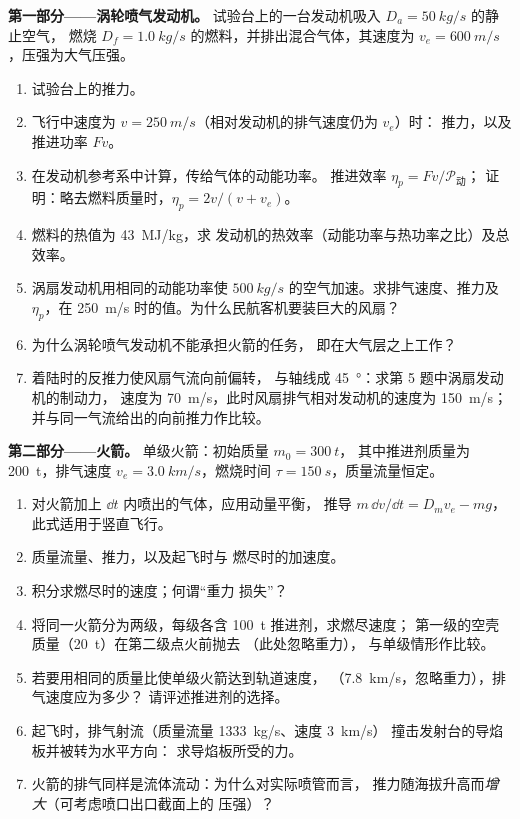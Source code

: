 \begin{problem}
\label{pb:b2:flow-balances:1}

\medskip
\noindent\textbf{第一部分——涡轮喷气发动机。}
试验台上的一台发动机吸入 $D_a = \qty{50}{kg/s}$ 的静止空气，
燃烧 $D_f = \qty{1.0}{kg/s}$ 的燃料，并排出混合气体，其速度为 $v_e =
\qty{600}{m/s}$，压强为大气压强。
\begin{enumerate}
  \item 试验台上的推力。
  \item 飞行中速度为 $v = \qty{250}{m/s}$（相对发动机的排气速度仍为 $v_e$）时：
        推力，以及推进功率 $Fv$。
  \item 在发动机参考系中计算，传给气体的动能功率。
        推进效率 $\eta_p = Fv/\mathcal P_{\text{动}}$；
        证明：略去燃料质量时，$\eta_p = 2v/(v + v_e)$。
  \item 燃料的热值为 \qty{43}{MJ/kg}，求
        发动机的热效率（动能功率与热功率之比）及总效率。
  \item 涡扇发动机用相同的动能功率使
        $\qty{500}{kg/s}$ 的空气加速。求排气速度、推力及 $\eta_p$，在
        \qty{250}{m/s} 时的值。为什么民航客机要装巨大的风扇？
  \item 为什么涡轮喷气发动机不能承担火箭的任务，
        即在大气层之上工作？
  \item 着陆时的反推力使风扇气流向前偏转，
        与轴线成 \qty{45}{\degree}：求第 5 题中涡扇发动机的制动力，
        速度为 \qty{70}{m/s}，此时风扇排气相对发动机的速度为
        \qty{150}{m/s}；
        并与同一气流给出的向前推力作比较。
\end{enumerate}

\medskip
\noindent\textbf{第二部分——火箭。}
单级火箭：初始质量 $m_0 = \qty{300}{t}$，
其中推进剂质量为 \qty{200}{t}，排气速度 $v_e = \qty{3.0}{km/s}$，燃烧时间 $\tau =
\qty{150}{s}$，质量流量恒定。
\begin{enumerate}[resume]
  \item 对火箭加上 $\dd t$ 内喷出的气体，应用动量平衡，
        推导 $m\,\dd v/\dd t = D_mv_e - mg$，
        此式适用于竖直飞行。
  \item 质量流量、推力，以及起飞时与
        燃尽时的加速度。
  \item 积分求燃尽时的速度；何谓“重力
        损失”？
  \item 将同一火箭分为两级，每级各含 \qty{100}{t} 推进剂，求燃尽速度；
        第一级的空壳质量（\qty{20}{t}）在第二级点火前抛去
        （此处忽略重力），
        与单级情形作比较。
  \item 若要用相同的质量比使单级火箭达到轨道速度，
        （\qty{7.8}{km/s}，忽略重力），排气速度应为多少？
        请评述推进剂的选择。
  \item 起飞时，排气射流（质量流量 \qty{1333}{kg/s}、速度 \qty{3}{km/s}）
        撞击发射台的导焰板并被转为水平方向：
        求导焰板所受的力。
  \item 火箭的排气同样是流体流动：为什么对实际喷管而言，
        推力随海拔升高而\emph{增大}（可考虑喷口出口截面上的
        压强）？
\end{enumerate}


\end{problem}
